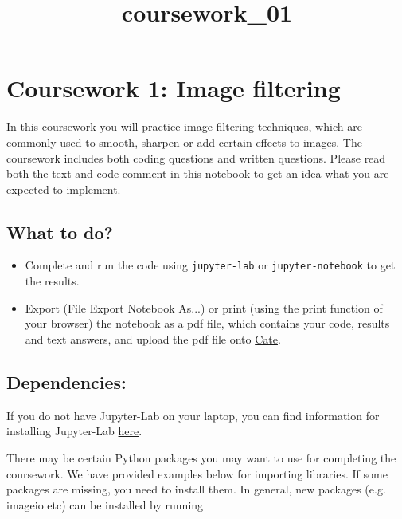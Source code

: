 \documentclass[11pt]{article}
\title{coursework\_01}
\begin{document}
    
    
    \maketitle
    
    

    
    \section{Coursework 1: Image
filtering}\label{coursework-1-image-filtering}

In this coursework you will practice image filtering techniques, which
are commonly used to smooth, sharpen or add certain effects to images.
The coursework includes both coding questions and written questions.
Please read both the text and code comment in this notebook to get an
idea what you are expected to implement.

\subsection{What to do?}\label{what-to-do}

\begin{itemize}
\item
  Complete and run the code using \texttt{jupyter-lab} or
  \texttt{jupyter-notebook} to get the results.
\item
  Export (File \textbar{} Export Notebook As...) or print (using the
  print function of your browser) the notebook as a pdf file, which
  contains your code, results and text answers, and upload the pdf file
  onto \href{https://cate.doc.ic.ac.uk}{Cate}.
\end{itemize}

\subsection{Dependencies:}\label{dependencies}

If you do not have Jupyter-Lab on your laptop, you can find information
for installing Jupyter-Lab
\href{https://jupyterlab.readthedocs.io/en/stable/getting_started/installation.html}{here}.

There may be certain Python packages you may want to use for completing
the coursework. We have provided examples below for importing libraries.
If some packages are missing, you need to install them. In general, new
packages (e.g. imageio etc) can be installed by running
\end{document}
